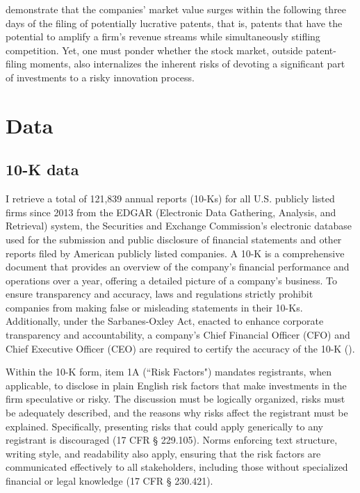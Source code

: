 \documentclass[12pt, letterpaper]{article}
\begin{document}
\citet{Kogan2017-fx} demonstrate that the companies' market value surges within the following three days of the filing of potentially lucrative patents, that is, patents that have the potential to amplify a firm's revenue streams while simultaneously stifling competition. Yet, one must ponder whether the stock market, outside patent-filing moments, also internalizes the inherent risks of devoting a significant part of investments to a risky innovation process.

\section{Data}

\subsection{10-K data}

I retrieve a total of  121,839 annual reports (10-Ks) for all U.S. publicly listed firms since 2013 from the EDGAR (Electronic Data Gathering, Analysis, and Retrieval) system, the Securities and Exchange Commission's electronic database used for the submission and public disclosure of financial statements and other reports filed by American publicly listed companies. A 10-K is a comprehensive document that provides an overview of the company's financial performance and operations over a year, offering a detailed picture of a company's business.  To ensure transparency and accuracy, laws and regulations strictly prohibit companies from making false or misleading statements in their 10-Ks. Additionally, under the Sarbanes-Oxley Act, enacted to enhance corporate transparency and accountability, a company's Chief Financial Officer (CFO) and Chief Executive Officer (CEO) are required to certify the accuracy of the 10-K (\cite{SEC_Office_of_Investor_Education_and_Advocacy2011-tw}).

Within the 10-K form, item 1A (``Risk Factors") mandates registrants, when applicable, to disclose in plain English risk factors that make investments in the firm speculative or risky. The discussion must be logically organized, risks must be adequately described, and the reasons why risks affect the registrant must be explained. Specifically, presenting risks that could apply generically to any registrant is discouraged (17 CFR § 229.105).  Norms enforcing text structure, writing style, and readability also apply, ensuring that the risk factors are communicated effectively to all stakeholders, including those without specialized financial or legal knowledge (17 CFR § 230.421).
\end{document}
